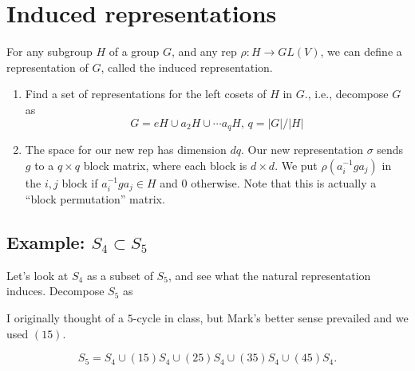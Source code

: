 \documentclass{article}
\theoremstyle{definition}
\begin{document}
\section{Induced representations}
For any subgroup $H$ of a group $G$, and any rep $\rho:H\to GL(V)$, we can
define a representation of $G$, called the induced representation.

\begin{enumerate}
\item Find a set of representations for the left cosets of $H$ in $G$., i.e.,
  decompose $G$ as
  $$G=eH\cup a_2 H\cup\cdots a_q H,\,q=|G|/|H|$$
\item The space for our new rep has dimension $dq$. Our new representation
  $\sigma$ sends $g$ to a $q\times q$ block matrix, where each block is $d\times
  d$. We put $\rho({a_i^{-1}}g a_j)$ in the $i,j$ block if ${a_i^{-1}}ga_j\in H$ and
  $0$ otherwise.
  Note that this is actually a ``block permutation'' matrix.
\end{enumerate}

\subsection{Example: $S_4\subset S_5$}

Let's look at $S_4$ as a subset of $S_5$, and see what the natural
representation induces. Decompose $S_5$ as

I originally thought of a $5$-cycle in class, but Mark's better sense prevailed
and we used $(15)$.

$$S_5 = S_4 \cup (15)S_4\cup (25) S_4\cup (35)S_4 \cup (45)S_4.$$
\end{document}
